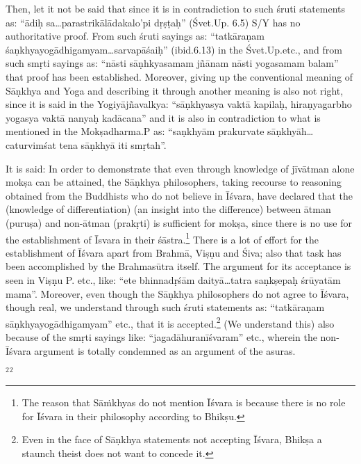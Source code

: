 Then, let it not be said that since it is in contradiction to such śruti statements as: “ādiḥ sa…parastrikālādakalo’pi dṛṣṭaḥ” (Śvet.Up. 6.5) S/Y has no authoritative proof.  From such śruti sayings as: “tatkāraṇam śaṇkhyayogādhigamyam…sarvapāśaiḥ” (ibid.6.13) in the Śvet.Up.etc., and from such smṛti sayings as: “nāsti sāṇhkyasamam jñānam nāsti yogasamam balam” that proof has been established. Moreover, giving up the conventional meaning of Sāṇkhya and Yoga and describing it through another meaning is also not right, since it is said in the Yogiyājñavalkya: “sāṇkhyasya vaktā kapilaḥ, hiraṇyagarbho yogasya vaktā nanyaḥ kadācana” and it is also in contradiction to what is mentioned in the Mokṣadharma.P as: “saṇkhyām prakurvate sāṇkhyāh…caturvimśat tena sāṇkhyā iti smṛtah”.

It is said: In order to demonstrate that even through knowledge of jīvātman alone mokṣa can be attained, the Sāṇkhya philosophers, taking recourse to reasoning obtained from the Buddhists who do not believe in Īśvara, have declared that the (knowledge of differentiation) (an insight into the difference) between ātman (puruṣa) and non-ātman (prakṛti) is sufficient  for mokṣa, since there is no use for the establishment of Īsvara in their śāstra.\footnote{The reason that Sāṁkhyas do not mention Īśvara is because there is no role for Īśvara in their philosophy according to Bhikṣu.} There is a lot of effort for the establishment of Īśvara apart from Brahmā, Viṣṇu and Śiva; also that task has been accomplished by the Brahmasūtra itself. The argument for its acceptance is seen in Viṣṇu P. etc., like: “ete bhinnadṛśām daityā…tatra saṇkṣepaḥ śrūyatām mama”. Moreover, even though the Sāṇkhya philosophers do not agree to Īśvara, though real, we understand through such śruti statements as:  “tatkāraṇam sāṇkhyayogādhigamyam” etc., that it is accepted.\footnote{Even in the face of Sāṇkhya statements not accepting Īśvara, Bhikṣa a staunch theist does not want to concede it.} (We understand this) also because of the smṛti sayings like: “jagadāhuranīśvaram” etc., wherein the non-Īśvara argument is totally condemned as an argument of the asuras.

 $^{2}$$^{2}$ 

